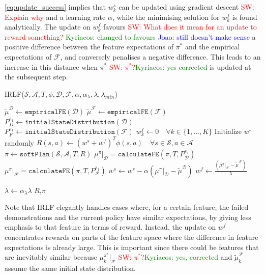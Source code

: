 \documentclass[letterpaper]{article}
\newcommand{\sw}[1]{\textcolor{red}{SW: #1}}
\newcommand{\jm}[1]{\textcolor{blue}{Joao: #1}}
\newcommand{\ks}[1]{\textcolor{green}{Kyriacos: #1}}
\newcommand{\sw}[1]{}
\newcommand{\jm}[1]{}
\newcommand{\ks}[1]{}
\begin{document}
\eqref{eq:update_success} implies that $w^s_k$ can be updated using gradient descent \sw{Explain why} and a learning rate $\alpha$, %
while the minimising solution for $w^f_k$ is found analytically. The update on $w^f_k$ favours \sw{What does it mean for an update to reward something?} \ks{changed to favours} \jm{still doesn't make sense} a positive difference between the feature expectations of $\pi^*$ and the empirical expectations of $\mathcal{F}$, and conversely penalises a negative difference.  This leads to an increase in this distance when $\pi^*$ \sw{$\pi^*$?}\ks{yes corrected} is updated at the subsequent step. 

\begin{algorithm}
\caption{IRLF($\mathcal{S},\mathcal{A},T, \phi, \mathcal{D}, \mathcal{F}, \alpha, \alpha_{\lambda}, \lambda, \lambda_{min}$) }
\label{alg:lff}
\begin{algorithmic}[1]
\STATE $\widetilde{\mu}^{\mathcal{D}} \gets \mathtt{empiricalFE}(\mathcal{D})$\hfill {}
\STATE $\widetilde{\mu}^{\mathcal{F}} \gets \mathtt{empiricalFE}(\mathcal{F})$ 
\STATE $P_{D}^{s_1} \gets \mathtt{initialStateDistribution}(\mathcal{D})$
\STATE $P_{F}^{s_1} \gets \mathtt{initialStateDistribution}(\mathcal{F})$
\STATE $w^f_k\gets 0\quad\forall k\in\{1,\ldots,K\}$
\STATE Initialize $w^s$ randomly
\REPEAT
\STATE $R(s,a) \gets (w^s+w^f)^T\phi(s,a)\quad\forall s\in\mathcal{S},a\in\mathcal{A}$
\STATE $\pi \gets \mathtt{softPlan}(\mathcal{S},\mathcal{A},T,R)$\hfill{}
\STATE $\mu^\pi|_{\mathcal{D}} = \mathtt{calculateFE}(\pi,T,P_{\mathcal{D}}^{s_1})$
\STATE $\mu^\pi|_{\mathcal{F}} = \mathtt{calculateFE}(\pi,T,P_{\mathcal{F}}^{s_1})$
\STATE $w^s \leftarrow w^s - \alpha (\mu^\pi|_{\mathcal{D}} - \widetilde{\mu}^{\mathcal{D}})$
\STATE $w^f \leftarrow \frac{(\mu^\pi|_{\mathcal{F}} - \widetilde{\mu}^{\mathcal{F}})}{\lambda}$

\STATE $\lambda \leftarrow \alpha_{\lambda}\lambda$
\ENDIF
{}
\RETURN $R$,$\pi$
\end{algorithmic}
\end{algorithm}

Note that IRLF elegantly handles cases where, for a certain feature, the failed demonstrations and the current policy have similar expectations, by giving less emphasis to that feature in terms of reward. Instead, the update on $w^f$ concentrates rewards on parts of the feature space where the difference in feature expectations is already large. This is important since there could be features that are inevitably similar because $\mu^{\pi^*}_k|_{\mathcal{F}}$ \sw{$\pi^*$?}\ks{yes, corrected} and $\widetilde{\mu}^{\mathcal{F}}_k$ assume the same initial state distribution.
\end{document}
